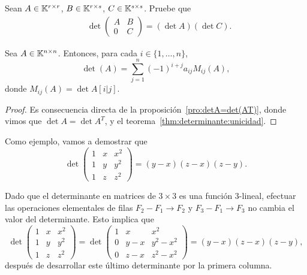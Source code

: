 \begin{xca}
	\label{xca:bloques_2x2}
	Sean $A\in\mathbb{K}^{r\times r}$, $B\in\mathbb{K}^{r\times s}$, $C\in\mathbb{K}^{s\times s}$.
	Pruebe que 
	\begin{align*}
		&\det\begin{pmatrix}
		A & B\\
		0 & C
	\end{pmatrix}
	=(\det A)(\det C).
	\end{align*}
\end{xca}

\begin{cor}
	Sea $A\in\mathbb{K}^{n\times n}$. Entonces, para cada $i\in\{1,\dots,n\}$, 
    \[
    \det(A)=\sum_{j=1}^n(-1)^{i+j}a_{ij}M_{ij}(A),
    \]
    donde $M_{ij}(A)=\det A[i|j]$. 
	\begin{proof}
		Es consecuencia directa de la proposición~\ref{pro:detA=det(AT)},
		donde vimos que $\det A=\det A^T$, y el
		teorema~\ref{thm:determinante:unicidad}. 
	\end{proof}
\end{cor}


\begin{example}
    Como ejemplo, vamos a demostrar que
    \[
    \det\begin{pmatrix}
        1 & x & x^2\\
        1 & y & y^2\\
        1 & z & z^2
    \end{pmatrix}
    =(y-x)(z-x)(z-y).
    \]

    Dado que el determinante en matrices de $3\times3$ es una función
    $3$-lineal, efectuar las operaciones elementales de filas $F_2-F_1\to F_2$
    y $F_3-F_1\to F_3$ no cambia el valor del determinante. Esto implica que 
    \[
    \det\begin{pmatrix}
        1 & x & x^2\\
        1 & y & y^2\\
        1 & z & z^2
    \end{pmatrix}
    =
    \det\begin{pmatrix}
        1 & x & x^2\\
        0 & y-x & y^2-x^2\\
        0 & z-x & z^2-x^2
    \end{pmatrix}
    =(y-x)(z-x)(z-y),
    \]
    después de desarrollar este último determinante por la primera columna.
\end{example}

